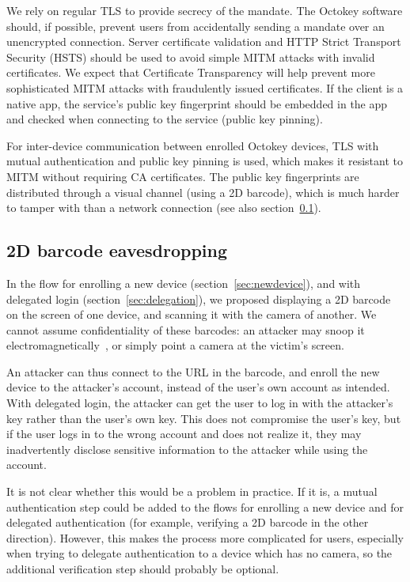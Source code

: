 We rely on regular TLS to provide secrecy of the mandate. The Octokey software should, if possible,
prevent users from accidentally sending a mandate over an unencrypted connection. Server certificate
validation and HTTP Strict Transport Security (HSTS) should be used to avoid simple MITM attacks
with invalid certificates. We expect that Certificate Transparency will help prevent more
sophisticated MITM attacks with fraudulently issued certificates. If the client is a native app, the
service's public key fingerprint should be embedded in the app and checked when connecting to the
service (public key pinning).

For inter-device communication between enrolled Octokey devices, TLS with mutual authentication and
public key pinning is used, which makes it resistant to MITM without requiring CA certificates. The
public key fingerprints are distributed through a visual channel (using a 2D barcode), which is much
harder to tamper with than a network connection (see also section~\ref{sec:barcode-intercept}).

\subsection{2D barcode eavesdropping}\label{sec:barcode-intercept}

In the flow for enrolling a new device (section~\ref{sec:newdevice}), and with delegated login
(section~\ref{sec:delegation}), we proposed displaying a 2D barcode on the screen of one device, and
scanning it with the camera of another. We cannot assume confidentiality of these barcodes: an
attacker may snoop it electromagnetically~\cite{Kuhn05}, or simply point a camera at the victim's
screen.

An attacker can thus connect to the URL in the barcode, and enroll the new device to the attacker's
account, instead of the user's own account as intended. With delegated login, the attacker can get
the user to log in with the attacker's key rather than the user's own key. This does not compromise
the user's key, but if the user logs in to the wrong account and does not realize it, they may
inadvertently disclose sensitive information to the attacker while using the account.

It is not clear whether this would be a problem in practice. If it is, a mutual authentication step
could be added to the flows for enrolling a new device and for delegated authentication (for
example, verifying a 2D barcode in the other direction). However, this makes the process more
complicated for users, especially when trying to delegate authentication to a device which has no
camera, so the additional verification step should probably be optional.

